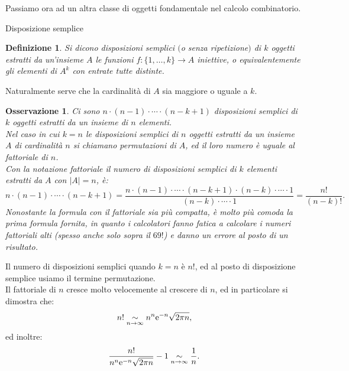 \documentclass[11pt]{book}
\theoremstyle{Definizione}
\newtheorem*{mydef}{Definizione}
\theoremstyle{TeoremaProposizioneLemmaCorollario}
\theoremstyle{OsservazioneNota}
\newtheorem{myobs}{Osservazione}[section]
\newcommand{\e}{\textup{e}}
\newcommand{\asintotico}[1]{\underset{{#1}}{\sim}}
\begin{document}
Passiamo ora ad un altra classe di oggetti fondamentale nel calcolo combinatorio.
\begin{boxdef}{Disposizione semplice}
\begin{mydef}
Si dicono disposizioni semplici $($o senza ripetizione$)$ di $k$ oggetti estratti da un'insieme $A$ le funzioni $f:\{1,\dots,k\}\longrightarrow A$ iniettive, o equivalentemente gli elementi di $A^k$ con entrate tutte distinte.
\end{mydef}
\end{boxdef}
\noindent
Naturalmente serve che la cardinalità di $A$ sia maggiore o uguale a $k$.
\begin{myobs}
Ci sono $n\cdot (n-1)\cdot \cdots \cdot (n-k+1)$ disposizioni semplici di $k$ oggetti estratti da un insieme di $n$ elementi.\\
Nel caso in cui $k = n$ le disposizioni semplici di $n$ oggetti estratti da un insieme $A$ di cardinalità $n$ si chiamano permutazioni di $A$, ed il loro numero è uguale al fattoriale di $n$.\\
Con la notazione fattoriale il numero di disposizioni semplici di $k$ elementi estratti da $A$ con $|A| = n$, è:
$$
n\cdot (n-1)\cdot \cdots \cdot (n-k+1) = \frac{n\cdot (n-1)\cdot \cdots \cdot (n-k+1) \cdot (n-k) \cdot \cdots \cdot 1}{(n-k) \cdot \cdots \cdot 1} = \frac{n!}{(n-k)!}.
$$
Nonostante la formula con il fattoriale sia più compatta, è molto più comoda la prima formula fornita, in quanto i calcolatori fanno fatica a calcolare i numeri fattoriali alti (spesso anche solo sopra il $69!$) e danno un errore al posto di un risultato.
\end{myobs}
Il numero di disposizioni semplici quando $k = n$ è $n!$, ed al posto di disposizione semplice usiamo il termine permutazione.\\
Il fattoriale di $n$ cresce molto velocemente al crescere di $n$, ed in particolare si dimostra che:
$$
n! \asintotico{n \to \infty} n^n \e^{-n} \sqrt{2\pi n},
$$
ed inoltre:
$$
\frac{n!}{n^n \e^{-n}\sqrt{2\pi n}} - 1\asintotico{n \to \infty} \frac{1}{n}.
$$
\end{document}
